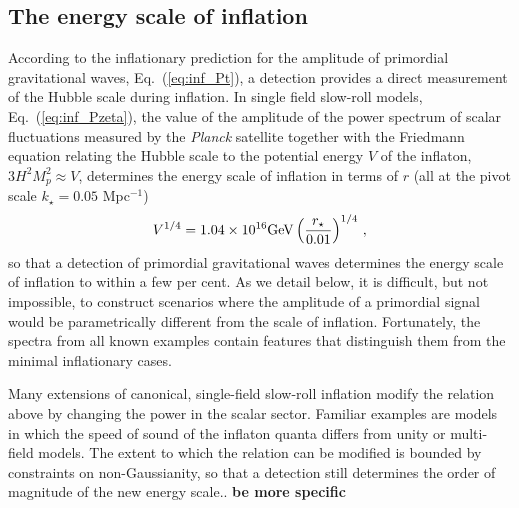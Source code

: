 

\subsection{The energy scale of inflation}
\label{sec:scale-of-inflation}
According to the inflationary prediction for the amplitude of primordial gravitational waves, Eq.~(\ref{eq:inf_Pt}), a detection provides a direct measurement of the Hubble scale during inflation. In single field slow-roll models, Eq.~(\ref{eq:inf_Pzeta}), the value of the amplitude of the power spectrum of scalar fluctuations measured by the {\it Planck} satellite together with the Friedmann equation relating the Hubble scale to the potential energy $V$ of the inflaton, $3H^2M_p^2\approx V$, determines the energy scale of inflation in terms of $r$ (all at the pivot scale $k_\star=0.05$ Mpc$^{-1}$)
\begin{equation}\label{eq:Vofr}
V^{1/4}=1.04\times 10^{16}{\rm GeV}\left(\frac{r_\star}{0.01}\right)^{1/4}\,,
\end{equation}
so that a detection of primordial gravitational waves determines the energy scale of inflation to within a few per cent. As we detail below, it is difficult, but not impossible, to construct scenarios where the amplitude of a primordial signal would be parametrically different from the scale of inflation. Fortunately, the spectra from all known examples contain features that  distinguish them from the minimal inflationary cases.

Many extensions of canonical, single-field slow-roll inflation modify the relation above by changing the power in the scalar sector. Familiar examples are models in which the speed of sound of the inflaton quanta differs from unity or multi-field models. The extent to which the relation can be modified is bounded by constraints on non-Gaussianity, so that a detection still determines the order of magnitude of the new energy scale.. {\bf be more specific}

